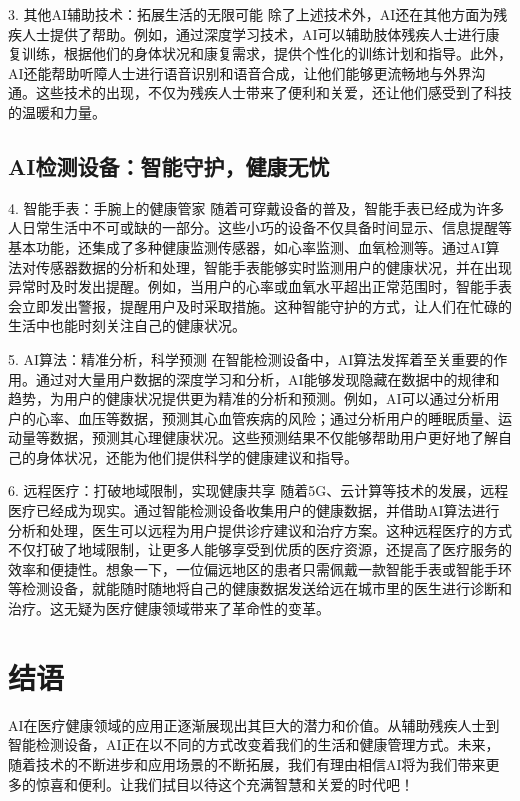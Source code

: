 3. 其他AI辅助技术：拓展生活的无限可能
除了上述技术外，AI还在其他方面为残疾人士提供了帮助。例如，通过深度学习技术，AI可以辅助肢体残疾人士进行康复训练，根据他们的身体状况和康复需求，提供个性化的训练计划和指导。此外，AI还能帮助听障人士进行语音识别和语音合成，让他们能够更流畅地与外界沟通。这些技术的出现，不仅为残疾人士带来了便利和关爱，还让他们感受到了科技的温暖和力量。

\subsection{AI检测设备：智能守护，健康无忧}
4. 智能手表：手腕上的健康管家
随着可穿戴设备的普及，智能手表已经成为许多人日常生活中不可或缺的一部分。这些小巧的设备不仅具备时间显示、信息提醒等基本功能，还集成了多种健康监测传感器，如心率监测、血氧检测等。通过AI算法对传感器数据的分析和处理，智能手表能够实时监测用户的健康状况，并在出现异常时及时发出提醒。例如，当用户的心率或血氧水平超出正常范围时，智能手表会立即发出警报，提醒用户及时采取措施。这种智能守护的方式，让人们在忙碌的生活中也能时刻关注自己的健康状况。

5. AI算法：精准分析，科学预测
在智能检测设备中，AI算法发挥着至关重要的作用。通过对大量用户数据的深度学习和分析，AI能够发现隐藏在数据中的规律和趋势，为用户的健康状况提供更为精准的分析和预测。例如，AI可以通过分析用户的心率、血压等数据，预测其心血管疾病的风险；通过分析用户的睡眠质量、运动量等数据，预测其心理健康状况。这些预测结果不仅能够帮助用户更好地了解自己的身体状况，还能为他们提供科学的健康建议和指导。

6. 远程医疗：打破地域限制，实现健康共享
随着5G、云计算等技术的发展，远程医疗已经成为现实。通过智能检测设备收集用户的健康数据，并借助AI算法进行分析和处理，医生可以远程为用户提供诊疗建议和治疗方案。这种远程医疗的方式不仅打破了地域限制，让更多人能够享受到优质的医疗资源，还提高了医疗服务的效率和便捷性。想象一下，一位偏远地区的患者只需佩戴一款智能手表或智能手环等检测设备，就能随时随地将自己的健康数据发送给远在城市里的医生进行诊断和治疗。这无疑为医疗健康领域带来了革命性的变革。

\section{结语}

AI在医疗健康领域的应用正逐渐展现出其巨大的潜力和价值。从辅助残疾人士到智能检测设备，AI正在以不同的方式改变着我们的生活和健康管理方式。未来，随着技术的不断进步和应用场景的不断拓展，我们有理由相信AI将为我们带来更多的惊喜和便利。让我们拭目以待这个充满智慧和关爱的时代吧！